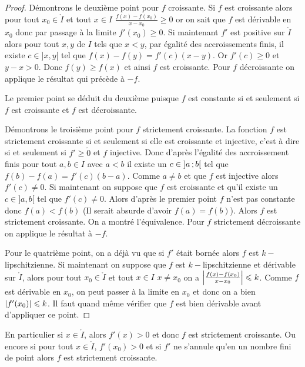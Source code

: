 \begin{proof}
  Démontrons le deuxième point pour \(f\) croissante. Si \(f\) est croissante 
  alors pour tout \(x_0 \in \mathring{I}\) et tout \(x \in I\) 
  \(\frac{f(x)-f(x_0)}{x-x_0} \geqslant 0\) or on sait que \(f\) est dérivable 
  en \(x_0\) donc par passage à la limite \(f'(x_0) \geqslant 0\). Si maintenant 
  \(f'\) est positive sur \(\mathring{I}\) alors pour tout \(x,y\) de \(I\) tels 
  que \(x < y\), par égalité des accroissements finis, il existe \(c \in ]x,y[\) 
  tel que \(f(x)-f(y) = f'(c)(x-y)\). Or \(f'(c) \geqslant 0\) et \(y-x > 0\). 
  Donc \(f(y) \geqslant f(x)\) et ainsi \(f\) est croissante. Pour \(f\) 
  décroissante on applique le résultat qui précède à \(-f\).

  Le premier point se déduit du deuxième puisque \(f\) est constante si et 
  seulement si \(f\) est croissante et \(f\) est décroissante.

  Démontrons le troisième point pour \(f\) strictement croissante. La fonction 
  \(f\) est strictement croissante si et seulement si elle est croissante et 
  injective, c'est à dire si et seulement si \(f' \geqslant \tilde{0}\) et \(f\) 
  injective. Donc d'après l'égalité des accroissement finis pour tout \(a,b \in 
  I\) avec \(a <b\) il existe un \(c \in \left] a \, ;  b \right[\) tel que 
  \(f(b)-f(a)=f'(c)(b-a)\). Comme \(a \neq b\) et que \(f\) est injective alors 
  \(f'(c) \neq 0\). Si maintenant on suppose que \(f\) est croissante et qu'il 
  existe un \(c \in ]a,b[\) tel que \(f'(c) \neq 0\). Alors d'après le premier 
  point \(f\) n'est pas constante donc \(f(a) < f(b)\) (Il serait absurde 
  d'avoir \(f(a)=f(b)\)). Alors \(f\) est strictement croissante. On a montré 
  l'équivalence. Pour \(f\) strictement décroissante on applique le résultat à 
  \(-f\).

  Pour le quatrième point, on a déjà vu que si \(f'\) était bornée alors \(f\) 
  est \(k-\)lipschitzienne. Si maintenant on suppose que \(f\) est 
  \(k-\)lipschitzienne et dérivable sur \(\mathring{I}\), alors pour tout \(x_0 
  \in \mathring{I}\) et tout \(x \in I\) \(x \neq x_0\) on a 
  \(\left\lvert\frac{f(x)-f(x_0)}{x-x_0}\right\rvert \leqslant k\). Comme \(f\) est dérivable en 
  \(x_0\), on peut passer à la limite en \(x_0\) et donc on a bien 
  \(\left\lvert f'(x_0)\right\rvert \leqslant k\). Il faut quand même vérifier que \(f\) est bien 
  dérivable avant d'appliquer ce point.
\end{proof}

En particulier si \(x \in \mathring{I}\), alors \(f'(x)>0\) et donc \(f\) est 
strictement croissante. Ou encore si pour tout \(x \in \mathring{I}\),  
\(f'(x_0) >0\) et si \(f'\) ne s'annule qu'en un nombre fini de point alors 
\(f\) est strictement croissante.

